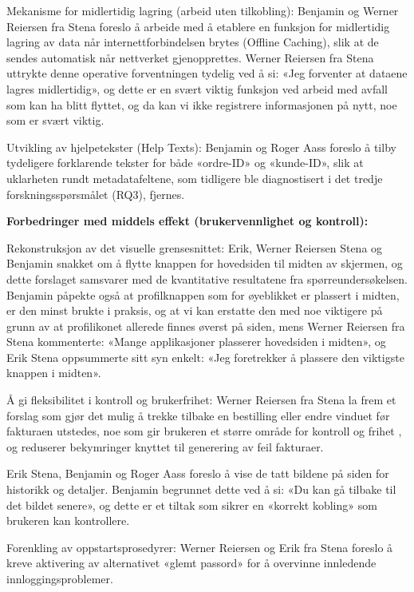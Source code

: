 Mekanisme for midlertidig lagring (arbeid uten tilkobling): Benjamin og Werner Reiersen fra Stena foreslo å arbeide med å etablere en funksjon for midlertidig lagring av data når internettforbindelsen brytes (Offline Caching), slik at de sendes automatisk når nettverket gjenopprettes. Werner Reiersen fra Stena uttrykte denne operative forventningen tydelig ved å si: «Jeg forventer at dataene lagres midlertidig», og dette er en svært viktig funksjon ved arbeid med avfall som kan ha blitt flyttet, og da kan vi ikke registrere informasjonen på nytt, noe som er svært viktig.

Utvikling av hjelpetekster (Help Texts): Benjamin og Roger Aass foreslo å tilby tydeligere forklarende tekster for både «ordre-ID» og «kunde-ID», slik at uklarheten rundt metadatafeltene, som tidligere ble diagnostisert i det tredje forskningsspørsmålet (RQ3), fjernes.

\textbf{Forbedringer med middels effekt (brukervennlighet og kontroll):}

Rekonstruksjon av det visuelle grensesnittet: Erik, Werner Reiersen Stena og Benjamin snakket om å flytte knappen for hovedsiden til midten av skjermen, og dette forslaget samsvarer med de kvantitative resultatene fra spørreundersøkelsen. Benjamin påpekte også at profilknappen som for øyeblikket er plassert i midten, er den minst brukte i praksis, og at vi kan erstatte den med noe viktigere på grunn av at profilikonet allerede finnes øverst på siden, mens Werner Reiersen fra Stena kommenterte: «Mange applikasjoner plasserer hovedsiden i midten», og Erik Stena oppsummerte sitt syn enkelt: «Jeg foretrekker å plassere den viktigste knappen i midten».

Å gi fleksibilitet i kontroll og brukerfrihet: Werner Reiersen fra Stena la frem et forslag som gjør det mulig å trekke tilbake en bestilling eller endre vinduet før fakturaen utstedes, noe som gir brukeren et større område for kontroll og frihet \cite{nielsen1994}, og reduserer bekymringer knyttet til generering av feil fakturaer.

Erik Stena, Benjamin og Roger Aass foreslo å vise de tatt bildene på siden for historikk og detaljer. Benjamin begrunnet dette ved å si: «Du kan gå tilbake til det bildet senere», og dette er et tiltak som sikrer en «korrekt kobling» \cite{wang1996} som brukeren kan kontrollere.

Forenkling av oppstartsprosedyrer: Werner Reiersen og Erik fra Stena foreslo å kreve aktivering av alternativet «glemt passord» for å overvinne innledende innloggingsproblemer.

